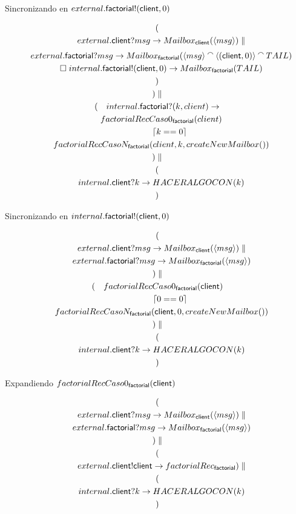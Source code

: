 \documentclass[fleqn]{article}
\newcommand{\myList}[1]{\langle #1 \rangle}
\newcommand{\myCons}[0]{\mathbin{\raise 0.8ex\hbox{$\smallfrown$}}}
\begin{document}
Sincronizando en $external.\mathsf{factorial}!(\mathsf{client}, 0)$

\begin{gather*}
( \\ 
\quad external.\mbc?msg \rightarrow Mailbox_\mbc(\myList{msg}) \parallel  \\
\quad external.\mbf?msg \rightarrow Mailbox_\mbf(\myList{msg} \myCons \myList{(\mbc,0)} \myCons TAIL) \\ 
\quad \square \; internal.\mbf!(\mbc,0) \rightarrow Mailbox_\mbf(TAIL) \\  
) \\
) \parallel \\
(
\quad internal.\mbf?(k,client) \rightarrow \\
\quad factorialRecCaso0_\mbf(client) \\
\quad \qquad \lceil k == 0 \rceil \\
\quad factorialRecCasoN_\mbf(client, k, createNewMailbox()) \\
) \parallel \\
( \\
\quad internal.\mbc?k \rightarrow HACERALGOCON(k) \\ 
)
\end{gather*}

Sincronizando en $internal.\mathsf{factorial}!(\mathsf{client},0)$

\begin{gather*}
( \\ 
\quad external.\mbc?msg \rightarrow Mailbox_\mbc(\myList{msg}) \parallel \\
\quad external.\mbf?msg \rightarrow Mailbox_\mbf(\myList{msg})  \\
) \parallel \\
(
\quad factorialRecCaso0_\mbf(\mbc) \\
\quad \qquad \lceil 0 == 0 \rceil \\
\quad factorialRecCasoN_\mbf(\mbc, 0, createNewMailbox()) \\
) \parallel \\
( \\
\quad internal.\mbc?k \rightarrow HACERALGOCON(k) \\ 
)
\end{gather*}

Expandiendo $factorialRecCaso0_{\mathsf{factorial}}(\mathsf{client})$

\begin{gather*}
( \\ 
\quad external.\mbc?msg \rightarrow Mailbox_\mbc(\myList{msg}) \parallel \\
\quad external.\mbf?msg \rightarrow Mailbox_\mbf(\myList{msg})  \\
) \parallel \\
( \\
\quad external.\mbc!\mbc \rightarrow factorialRec_\mbf
) \parallel \\
( \\
\quad internal.\mbc?k \rightarrow HACERALGOCON(k) \\ 
)
\end{gather*}
\end{document}
